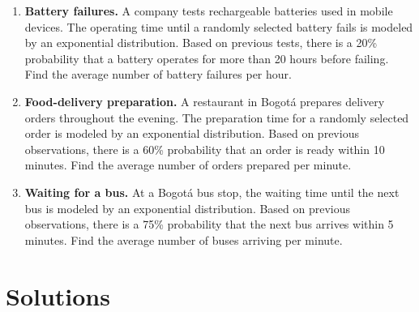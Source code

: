 \begin{enumerate}[
	leftmargin=*,
	itemsep=4pt,
	parsep=0pt,
	topsep=2pt
	]
	\item
	\textbf{Battery failures.}
	A company tests rechargeable batteries used in mobile devices. The
	operating time until a randomly selected battery fails is modeled by an
	exponential distribution. Based on previous tests, there is a 20\%
	probability that a battery operates for more than 20 hours before failing.
	Find the average number of battery failures per hour.
	
	\item
	\textbf{Food-delivery preparation.}
	A restaurant in Bogotá prepares delivery orders throughout the evening.
	The preparation time for a randomly selected order is modeled by an
	exponential distribution. Based on previous observations, there is a 60\%
	probability that an order is ready within 10 minutes. Find the average
	number of orders prepared per minute.
	
	\item
	\textbf{Waiting for a bus.}
	At a Bogotá bus stop, the waiting time until the next bus is modeled by an
	exponential distribution. Based on previous observations, there is a 75\%
	probability that the next bus arrives within 5 minutes. Find the average
	number of buses arriving per minute.
	
\end{enumerate}


	
	\newpage
	\restoregeometry
	
	\vspace*{-15mm}
	
\section{Solutions}


